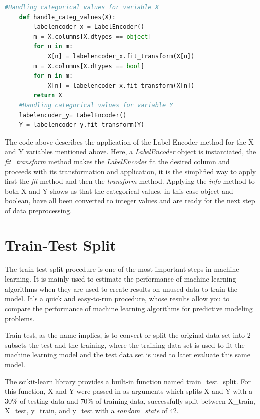 \begin{lstlisting}[language=Python]
    #Handling categorical values for variable X
    def handle_categ_values(X):
        labelencoder_x = LabelEncoder()
        m = X.columns[X.dtypes == object]
        for n in m:
            X[n] = labelencoder_x.fit_transform(X[n])
        m = X.columns[X.dtypes == bool]
        for n in m:
            X[n] = labelencoder_x.fit_transform(X[n])    
        return X
    #Handling categorical values for variable Y
    labelencoder_y= LabelEncoder()  
    Y = labelencoder_y.fit_transform(Y)
\end{lstlisting}

The code above describes the application of the Label Encoder method for the X and Y variables mentioned above. Here, a \textit{LabelEncoder} object is instantiated, the \textit{fit\_transform} method makes the \textit{LabelEncoder} fit the desired column and proceeds with its transformation and application, it is the simplified way to apply first the \textit{fit} method and then the \textit{transform} method. Applying the \textit{info} method to both X and Y shows us that the categorical values, in this case object and boolean, have all been converted to integer values and are ready for the next step of data preprocessing.

\section{Train-Test Split} %
\label{sec:importing_images}
\hspace{10px}The train-test split procedure is one of the most important steps in machine learning. It is mainly used to estimate the performance of machine learning algorithms when they are used to create results on unused data to train the model. It's a quick and easy-to-run procedure, whose results allow you to compare the performance of machine learning algorithms for predictive modeling problems.

Train-test, as the name implies, is to convert or split the original data set into 2 subsets the test and the training, where the training data set is used to fit the machine learning model and the test data set is used to later evaluate this same model.

The scikit-learn library provides a built-in function named train\_test\_split. For this function, X and Y were passed-in as arguments which splits X and Y with a 30\% of testing data and 70\% of training data, successfully split between X\_train, X\_test, y\_train, and y\_test with a \textit{random\_state} of 42.



